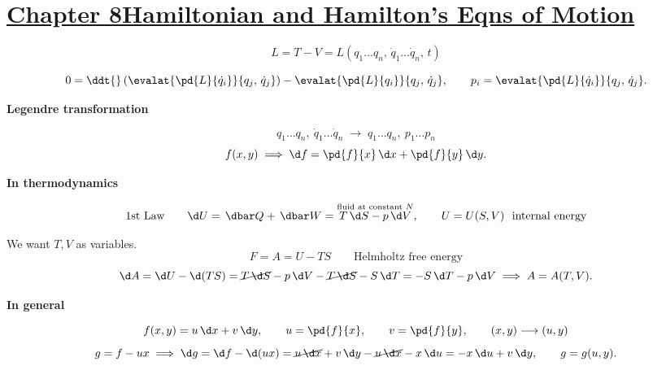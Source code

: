\documentclass[11pt]{article}
\begin{document}
\section*{\underline{Chapter 8}\quad \underline{Hamiltonian and Hamilton's Eqns of Motion}}

\[
L = T - V = L(q_{1}\ldots q_{n},\,\dot q_{1}\ldots \dot q_{n},\, t)
\]

\begin{equation}
0 = \ddt{}\left(\evalat{\pd{L}{\dot q_{i}}}{q_{j},\,\dot q_{j}}\right)
  - \evalat{\pd{L}{q_{i}}}{q_{j},\,\dot q_{j}},
\qquad
p_{i} = \evalat{\pd{L}{\dot q_{i}}}{q_{j},\,\dot q_{j}} .
\label{eq:EL}
\end{equation}

\begin{center}
\end{center}

\medskip\noindent\textbf{Legendre transformation}\par
\[
q_{1}\ldots q_{n},\ \dot q_{1}\ldots \dot q_{n}
\;\longrightarrow\;
q_{1}\ldots q_{n},\ p_{1}\ldots p_{n}
\]
\[
f(x,y) \;\Longrightarrow\;
\d f = \pd{f}{x}\,\d x + \pd{f}{y}\,\d y .
\]

\medskip\noindent\textbf{In thermodynamics}\par

\[
\text{1st Law}\qquad
\d U = \,\dbar Q + \,\dbar W = \overset{\text{\scriptsize fluid at constant $N$}}{T\,\d S - p\,\d V},
\qquad
U = U(S,V)\ \ \text{internal energy}
\]

We want $T,V$ as variables.
\[
F = A = U - TS \qquad \text{Helmholtz free energy}
\]
\[
\d A = \d U - \d(TS)
 = \cancel{T\,\d S} - p\,\d V - \cancel{T\,\d S} - S\,\d T
 = -S\,\d T - p\,\d V
\;\Longrightarrow\; A = A(T,V).
\]

\medskip\noindent\textbf{In general}\par

\[
f(x,y) = u\,\d x + v\,\d y,
\qquad
u = \pd{f}{x},\qquad v = \pd{f}{y},
\qquad (x,y) \longrightarrow (u,y)
\]
\[
g = f - ux \;\Longrightarrow\;
\d g = \d f - \d(ux)
 = \cancel{u\,\d x} + v\,\d y - \cancel{u\,\d x} - x\,\d u
 = -x\,\d u + v\,\d y,
\qquad g = g(u,y).
\]
\end{document}
